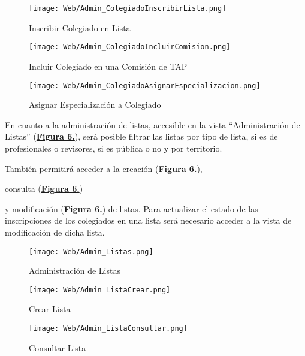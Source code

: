\begin{figure}[!htbp]
  \centering
  \texttt{[image: Web/Admin\_ColegiadoInscribirLista.png]}
  \caption{Inscribir Colegiado en Lista}
  \label{fig:Web_Admin_ColegiadoInscribirLista}
\end{figure}
\FloatBarrier

\begin{figure}[!htbp]
  \centering
  \texttt{[image: Web/Admin\_ColegiadoIncluirComision.png]}
  \caption{Incluir Colegiado en una Comisión de TAP}
  \label{fig:Web_Admin_ColegiadoIncluirComision}
\end{figure}
\FloatBarrier

\begin{figure}[!htbp]
  \centering
  \texttt{[image: Web/Admin\_ColegiadoAsignarEspecializacion.png]}
  \caption{Asignar Especialización a Colegiado}
  \label{fig:Web_Admin_ColegiadoAsignarEspecializacion}
\end{figure}
\FloatBarrier

\addtocounter{figura_manual}{1} En cuanto a la administración de listas, accesible en la vista ``Administración de Listas'' (\textbf{\hyperref[fig:Web_Admin_Listas]{Figura 6.}}), será posible filtrar las listas por tipo de lista, si es de profesionales o revisores, si es pública o no y por territorio.\addtocounter{figura_manual}{1}  También permitirá acceder a la creación (\textbf{\hyperref[fig:Web_Admin_ListaCrear]{Figura 6.}}),\addtocounter{figura_manual}{1}  consulta (\textbf{\hyperref[fig:Web_Admin_ListaConsultar]{Figura 6.}})\addtocounter{figura_manual}{1}  y modificación (\textbf{\hyperref[fig:Web_Admin_ListaModificar]{Figura 6.}}) de listas. Para actualizar el estado de las inscripciones de los colegiados en una lista será necesario acceder a la vista de modificación de dicha lista.
\begin{figure}[!htbp]
  \centering
  \texttt{[image: Web/Admin\_Listas.png]}
  \caption{Administración de Listas}
  \label{fig:Web_Admin_Listas}
\end{figure}
\FloatBarrier

\begin{figure}[!h]
  \centering
  \texttt{[image: Web/Admin\_ListaCrear.png]}
  \caption{Crear Lista}
  \label{fig:Web_Admin_ListaCrear}
\end{figure}
\FloatBarrier

\begin{figure}[!h]
  \centering
  \texttt{[image: Web/Admin\_ListaConsultar.png]}
  \caption{Consultar Lista}
  \label{fig:Web_Admin_ListaConsultar}
\end{figure}
\FloatBarrier

